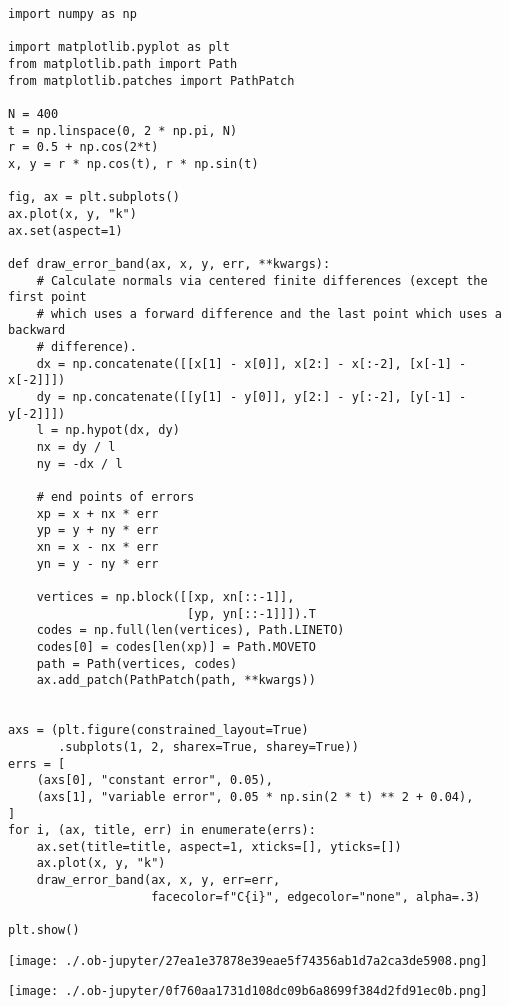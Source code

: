 \documentclass[11pt]{article}
\begin{document}
\begin{verbatim}
import numpy as np

import matplotlib.pyplot as plt
from matplotlib.path import Path
from matplotlib.patches import PathPatch

N = 400
t = np.linspace(0, 2 * np.pi, N)
r = 0.5 + np.cos(2*t)
x, y = r * np.cos(t), r * np.sin(t)

fig, ax = plt.subplots()
ax.plot(x, y, "k")
ax.set(aspect=1)

def draw_error_band(ax, x, y, err, **kwargs):
    # Calculate normals via centered finite differences (except the first point
    # which uses a forward difference and the last point which uses a backward
    # difference).
    dx = np.concatenate([[x[1] - x[0]], x[2:] - x[:-2], [x[-1] - x[-2]]])
    dy = np.concatenate([[y[1] - y[0]], y[2:] - y[:-2], [y[-1] - y[-2]]])
    l = np.hypot(dx, dy)
    nx = dy / l
    ny = -dx / l

    # end points of errors
    xp = x + nx * err
    yp = y + ny * err
    xn = x - nx * err
    yn = y - ny * err

    vertices = np.block([[xp, xn[::-1]],
                         [yp, yn[::-1]]]).T
    codes = np.full(len(vertices), Path.LINETO)
    codes[0] = codes[len(xp)] = Path.MOVETO
    path = Path(vertices, codes)
    ax.add_patch(PathPatch(path, **kwargs))


axs = (plt.figure(constrained_layout=True)
       .subplots(1, 2, sharex=True, sharey=True))
errs = [
    (axs[0], "constant error", 0.05),
    (axs[1], "variable error", 0.05 * np.sin(2 * t) ** 2 + 0.04),
]
for i, (ax, title, err) in enumerate(errs):
    ax.set(title=title, aspect=1, xticks=[], yticks=[])
    ax.plot(x, y, "k")
    draw_error_band(ax, x, y, err=err,
                    facecolor=f"C{i}", edgecolor="none", alpha=.3)

plt.show()

\end{verbatim}

\begin{center}
\texttt{[image: ./.ob-jupyter/27ea1e37878e39eae5f74356ab1d7a2ca3de5908.png]}
\end{center}
\begin{center}
\texttt{[image: ./.ob-jupyter/0f760aa1731d108dc09b6a8699f384d2fd91ec0b.png]}
\end{center}
\end{document}
